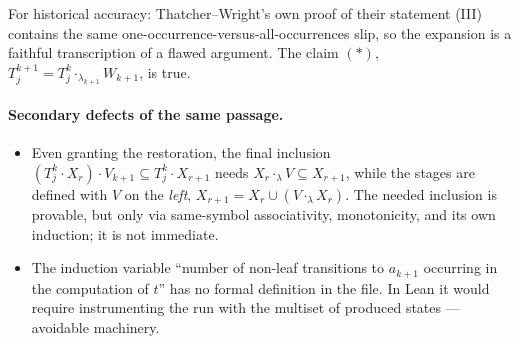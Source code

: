 \documentclass[11pt]{article}
\newcommand{\TW}{Thatcher--Wright}
\begin{document}
For historical accuracy: \TW{}'s own proof of their statement (III) contains
the same one-occurrence-versus-all-occurrences slip, so the expansion is a
faithful transcription of a flawed argument.  The claim \((*)\),
\(T_j^{k+1}=T_j^k\cdot_{\lambda_{k+1}}W_{k+1}\), is true.

\paragraph{Secondary defects of the same passage.}
\begin{itemize}[leftmargin=*]
  \item Even granting the restoration, the final inclusion
    \((T_j^k\cdot X_r)\cdot V_{k+1}\subseteq T_j^k\cdot X_{r+1}\) needs
    \(X_r\cdot_{\lambda}V\subseteq X_{r+1}\), while the stages are defined with
    \(V\) on the \emph{left}, \(X_{r+1}=X_r\cup(V\cdot_\lambda X_r)\).  The
    needed inclusion is provable, but only via same-symbol associativity,
    monotonicity, and its own induction; it is not immediate.
  \item The induction variable ``number of non-leaf transitions to
    \(a_{k+1}\) occurring in the computation of \(t\)'' has no formal
    definition in the file.  In Lean it would require instrumenting the run
    with the multiset of produced states --- avoidable machinery.
\end{itemize}
\end{document}
